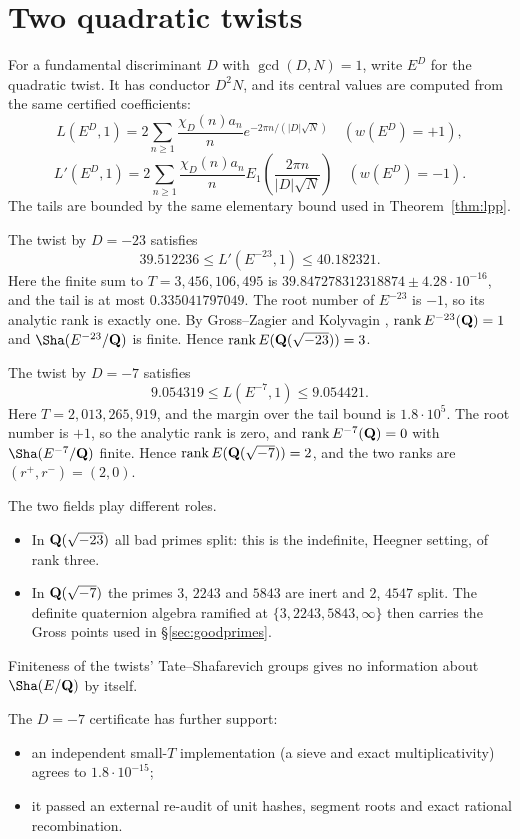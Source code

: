\section{Two quadratic twists}\label{sec:twists}

For a fundamental discriminant $D$ with $\gcd(D,N)=1$, write $E^D$ for the quadratic twist. It has conductor $D^2N$, and its central values are computed from the same certified coefficients:
\[
L(E^D,1)=2\sum_{n\ge1}\frac{\chi_D(n)a_n}{n}e^{-2\pi n/(|D|\sqrt N)}\quad(w(E^D)=+1),
\]
\[
L'(E^D,1)=2\sum_{n\ge1}\frac{\chi_D(n)a_n}{n}E_1\!\left(\frac{2\pi n}{|D|\sqrt N}\right)\quad(w(E^D)=-1).
\]
The tails are bounded by the same elementary bound used in Theorem~\ref{thm:lpp}.

\begin{theorem}\label{thm:d23}
The twist by $D=-23$ satisfies
\[
39.512236\le L'(E^{-23},1)\le40.182321 .
\]
Here the finite sum to $T=3{,}456{,}106{,}495$ is $39.847278312318874\pm4.28\cdot10^{-16}$, and the tail is at most $0.335041797049$. The root number of $E^{-23}$ is $-1$, so its analytic rank is exactly one. By Gross--Zagier \cite{gz} and Kolyvagin \cite{kolyvagin}, $\operatorname{rank} E^{-23}(\mathbf{Q})=1$ and $\Sha(E^{-23}/\Q)$ is finite. Hence $\operatorname{rank} E(\mathbf{Q}(\sqrt{-23}))=3$.
\end{theorem}

\begin{theorem}\label{thm:d7}
The twist by $D=-7$ satisfies
\[
9.054319\le L(E^{-7},1)\le9.054421 .
\]
Here $T=2{,}013{,}265{,}919$, and the margin over the tail bound is $1.8\cdot10^5$. The root number is $+1$, so the analytic rank is zero, and $\operatorname{rank} E^{-7}(\mathbf{Q})=0$ with $\Sha(E^{-7}/\Q)$ finite. Hence $\operatorname{rank} E(\mathbf{Q}(\sqrt{-7}))=2$, and the two ranks are $(r^+,r^-)=(2,0)$.
\end{theorem}

\begin{remark}
The two fields play different roles.
\begin{itemize}[leftmargin=*]
\item In $\mathbf{Q}(\sqrt{-23})$ all bad primes split: this is the indefinite, Heegner setting, of rank three.
\item In $\mathbf{Q}(\sqrt{-7})$ the primes $3$, $2243$ and $5843$ are inert and $2$, $4547$ split. The definite quaternion algebra ramified at $\{3,2243,5843,\infty\}$ then carries the Gross points used in \S\ref{sec:goodprimes}.
\end{itemize}
Finiteness of the twists' Tate--Shafarevich groups gives no information about $\Sha(E/\Q)$ by itself.

The $D=-7$ certificate has further support:
\begin{itemize}[leftmargin=*]
\item an independent small-$T$ implementation (a sieve and exact multiplicativity) agrees to $1.8\cdot10^{-15}$;
\item it passed an external re-audit of unit hashes, segment roots and exact rational recombination.
\end{itemize}
\end{remark}
